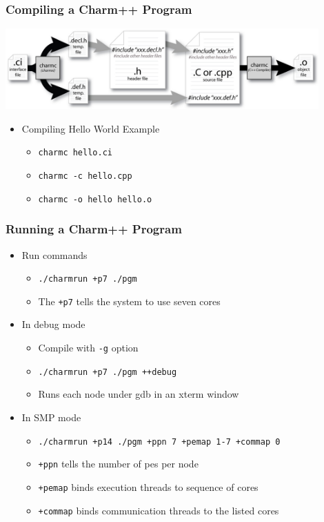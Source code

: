 \begin{frame}
  \frametitle{Compiling a Charm++ Program}
  \begin{center}
    \includegraphics[width=0.9\textwidth]{figures/charmCompile.jpg}
  \end{center}
  \begin{itemize}
    \item Compiling Hello World Example
    \begin{itemize}
      \item \texttt{charmc hello.ci}
      \item \texttt{charmc -c hello.cpp}
      \item \texttt{charmc -o hello hello.o}
    \end{itemize}
  \end{itemize}
\end{frame}

\begin{frame}
  \frametitle{Running a Charm++ Program}
  \begin{itemize}
    \item Run commands
    \begin{itemize}
      \item \texttt{./charmrun +p7 ./pgm}
      \item The \texttt{+p7} tells the system to use seven cores
    \end{itemize}
    \item In debug mode
    \begin{itemize}
      \item Compile with \texttt{-g} option
      \item \texttt{./charmrun +p7 ./pgm ++debug}
      \item Runs each node under gdb in an xterm window
    \end{itemize}
    \item In SMP mode
    \begin{itemize}
      \item \texttt{./charmrun +p14 ./pgm +ppn 7 +pemap 1-7 +commap 0}
      \item \texttt{+ppn} tells the number of pes per node
      \item \texttt{+pemap} binds execution threads to sequence of cores
      \item \texttt{+commap} binds communication threads to the listed cores
    \end{itemize}
  \end{itemize}
\end{frame}


